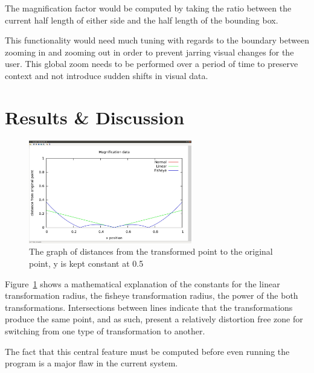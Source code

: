 \documentclass[annual]{acmsiggraph}
\begin{document}
The magnification factor would be computed by taking the ratio between the
current half length of either side and the half length of the bounding box. 

This functionality would need much tuning with regards to the boundary between
zooming in and zooming out in order to prevent jarring visual changes for the user.
This global zoom needs to be performed over a period of time to preserve
context and not introduce sudden shifts in visual data.

\section{Results \& Discussion}
\begin{figure}
	\centering
	\includegraphics[width=2.8in]{figures/graph.jpg}
	\caption{The graph of distances from the transformed point to the original
    point, y is kept constant at 0.5}
	\label{fig:graph}
\end{figure}

Figure~\ref{fig:graph} shows a mathematical explanation of the constants for the linear
transformation radius, the fisheye transformation radius, the power of the
both transformations. Intersections between lines indicate that the
transformations produce the same point, and as such, present a relatively
distortion free zone for switching from one type of transformation to another.

The fact that this central feature must be computed before even
running the program is a major flaw in the current system.
\end{document}

